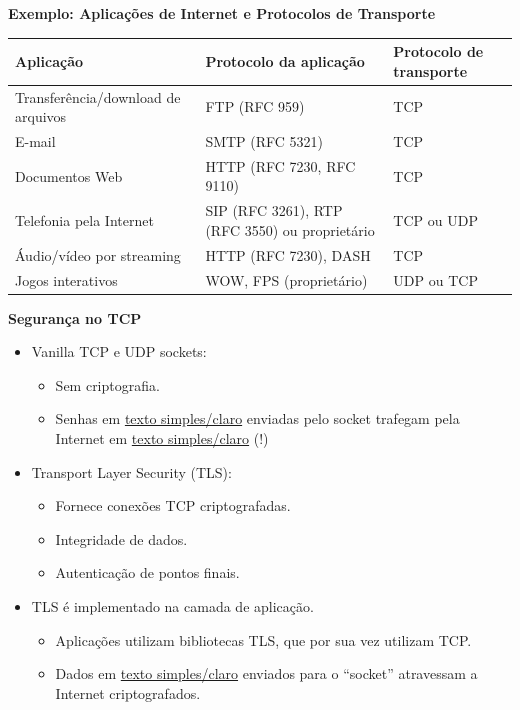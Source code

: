     \textbf{Exemplo: Aplicações de Internet e Protocolos de Transporte}
    \begin{table}[ht]
        \centering
        \footnotesize
        \setlength{\tabcolsep}{4pt}

        \begin{tabular}{lll}
            \toprule
            \textbf{Aplicação} & \textbf{Protocolo da aplicação} & \textbf{Protocolo de transporte} \\
            \midrule
            Transferência/download de arquivos & FTP (RFC 959) & TCP \\
            E-mail & SMTP (RFC 5321) & TCP \\
            Documentos Web & HTTP (RFC 7230, RFC 9110) & TCP \\
            Telefonia pela Internet &
            SIP (RFC 3261), RTP (RFC 3550) ou proprietário &
            TCP ou UDP \\
            Áudio/vídeo por streaming &
            HTTP (RFC 7230), DASH &
            TCP \\
            Jogos interativos &
            WOW, FPS (proprietário) &
            UDP ou TCP \\
            \bottomrule
        \end{tabular}

    \end{table}
    
    \textbf{Segurança no TCP}
    \begin{itemize}[left=0.5cm, align=left, nosep]    
        \item Vanilla TCP e UDP sockets:
        \begin{itemize}[left=0.5cm, nosep, label=$\hookrightarrow$]
            \item Sem criptografia.
            \item Senhas em \underline{texto simples/claro} enviadas pelo socket trafegam pela Internet em \underline{texto simples/claro} (!)
        \end{itemize}  
        \item Transport Layer Security (TLS):
        \begin{itemize}[left=0.5cm, nosep, label=$\hookrightarrow$]
            \item Fornece conexões TCP criptografadas.
            \item Integridade de dados.
            \item Autenticação de pontos finais.
        \end{itemize} 
        \item TLS é implementado na camada de aplicação.
        \begin{itemize}[left=0.5cm, nosep, label=$\hookrightarrow$]
            \item Aplicações utilizam bibliotecas TLS, que por sua vez utilizam TCP.
            \item Dados em \underline{texto simples/claro} enviados para o ``socket'' atravessam a Internet criptografados.
        \end{itemize} 
    \end{itemize}

